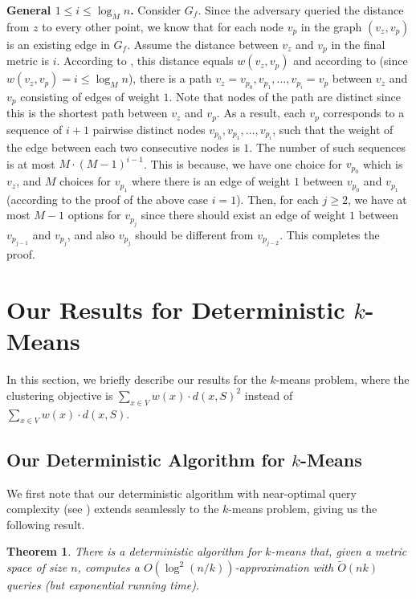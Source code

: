 \documentclass[11pt]{article}
\newcommand{\1}{\mathmybb{1}}
\newtheorem{theorem}{Theorem}[section]
\begin{document}
\medskip
\noindent \textbf{General $1 \leq i \leq \log_M n$.}
Consider $G_f$. Since the adversary queried the distance from $z$ to every other point, we know that for each node $v_p$ in the graph $(v_z,v_p)$ is an existing edge in $G_f$.
Assume the distance between $v_z$ and $v_p$ in the final metric is $i$.
According to , this distance equals $w(v_z,v_p)$ and according to  (since $w(v_z,v_p) = i \leq \log_M n$), there is a path $v_z = v_{p_0}, v_{p_1}, \ldots , v_{p_{i}} = v_p$ between $v_z$ and $v_p$ consisting of edges of weight $1$.
Note that nodes of the path are distinct since this is the shortest path between $v_z$ and $v_p$.
As a result, each $v_p$ corresponds to a sequence of $i+1$ pairwise distinct nodes $v_{p_0}, v_{p_1},\ldots, v_{p_i}$, such that the weight of the edge between each two consecutive nodes is $1$.
The number of such sequences is at most $M\cdot (M-1)^{i-1}$.
This is because, we have one choice for $v_{p_0}$ which is $v_z$, and $M$ choices for $v_{p_1}$ where there is an edge of weight $1$ between $v_{p_0}$ and $v_{p_1}$ (according to the proof of the above case $i=1$).
Then, for each $j \geq 2$, we have at most $M-1$ options for $v_{p_j}$ since there should exist an edge of weight $1$ between $v_{p_{j-1}}$ and $v_{p_j}$, and also $v_{p_j}$ should be different from $v_{p_{j-2}}$.
This completes the proof. 
\section{Our Results for Deterministic $k$-Means}\label{sec:out-k-means}

In this section, we briefly describe our results for the $k$-means problem, where the clustering objective is $\sum_{x \in V}  w(x) \cdot d(x,S)^2$ instead of $\sum_{x \in V}  w(x) \cdot d(x,S)$.

\subsection{Our Deterministic Algorithm for $k$-Means}

We first note that our deterministic algorithm with near-optimal query complexity (see ) extends seamlessly to the $k$-means problem, giving us the following result.

\begin{theorem}\label{thm:kmeans:query}
    There is a deterministic algorithm for $k$-means that, given a metric space of size $n$, computes a $O(\log^2(n/k))$-approximation with $\tilde O(nk)$ queries (but exponential running time).
\end{theorem}
\end{document}
